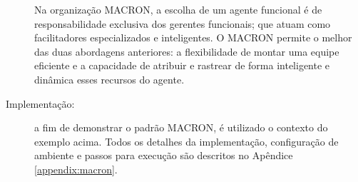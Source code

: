 \begin{description}
Na organização MACRON, a escolha de um agente funcional é de responsabilidade exclusiva dos gerentes funcionais; que atuam como facilitadores especializados e inteligentes. O MACRON permite o melhor das duas abordagens anteriores: a flexibilidade de montar uma equipe eficiente e a capacidade de atribuir e rastrear de forma inteligente e dinâmica esses recursos do agente.

\item[Implementação:] a fim de demonstrar o padrão MACRON, é utilizado o contexto do exemplo acima. Todos os detalhes da implementação, configuração de ambiente e passos para execução são descritos no Apêndice \ref{appendix:macron}.

\end{description}









